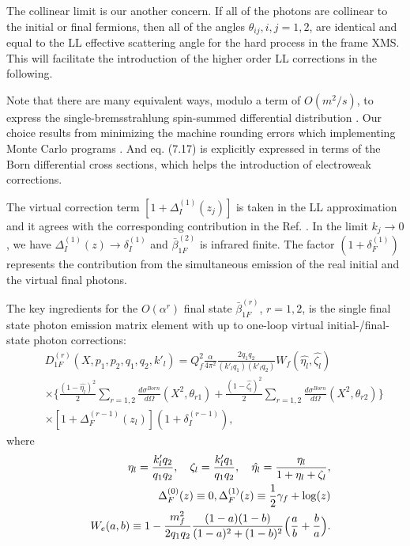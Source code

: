 The collinear limit is our another concern. If all of the photons are collinear to the initial or final fermions, then all of the angles $\theta_{ij}, i,j=1,2$, are identical and equal to the LL effective
scattering angle for the hard process in the frame XMS. This will facilitate the introduction of  the higher order LL corrections in the following.

Note that there are many equivalent ways, modulo a term of $O(m^2/s)$, to express the single-bremsstrahlung spin-summed differential distribution \cite{BKJ-NPB}. Our choice results from minimizing the machine rounding errors which implementing Monte Carlo programs \cite{KORALZ,YFS2,KKMC}. And eq. (7.17) is explicitly expressed in terms of the Born differential cross sections, which helps the introduction of electroweak corrections.

The virtual correction term $[1+\Delta_I^{(1)}(z_j)]$ is taken in the LL approximation and it agrees with the corresponding contribution in the Ref. \cite{BWF-NPB}. In the limit $k_j\to 0$, we have $\Delta_I^{(1)}(z)\to \delta_I^{(1)}$ and $\bar{\beta}_{1F}^{(2)}$ is infrared finite. The factor $(1+\delta_F^{(1)})$ represents the contribution from the simultaneous emission of the real initial and the virtual final photons.

The key ingredients for the $O(\alpha^r)$ final state $\bar{\beta}_{1F}^{(r)}$, $r=1,2$, is the single final state photon emission matrix element with up to one-loop virtual initial-/final-state photon corrections:
\begin{eqnarray}
&&D_{1F}^{(r)}(X,p_1,p_2,q_1,q_2,k'_l)=Q_f^2\frac{\alpha}{4\pi^2}\frac{2q_1 q_2}{(k'_l q_1)(k'_l q_2)} W_f(\hat{\eta_l},\hat{\zeta_l})\nonumber\\
&&\times \Biggl\{ \frac{(1-\hat{\eta_l})^2}{2} \sum_{r=1,2} \frac{d\sigma^{Born}}{d\Omega}(X^2, \theta_{r1}) + \frac{(1-\hat{\zeta_l})^2}{2} \sum_{r=1,2} \frac{d\sigma^{Born}}{d\Omega}(X^2, \theta_{r2}) \Biggr\}\nonumber\\
&&\times \left[1+\Delta_F^{(r-1)}(z_l)\right](1+\delta_I^{(r-1)}),
\end{eqnarray} 
where
\begin{eqnarray}
&&\eta_l=\frac{k'_l q_2}{q_1 q_2}, \quad \zeta_l=\frac{k'_l q_1}{q_1 q_2}, \quad
\hat{\eta_l}=\frac{\eta_l}{1+\eta_l+\zeta_l},\nonumber\\
&&\Delta_F^{(0)}(z)\equiv 0, \Delta_F^{(1)}(z)\equiv \frac{1}{2}\gamma_f+\log(z)\nonumber\\
&&W_e(a,b)\equiv 1-\frac{m_f^2}{2q_1 q_2}\frac{(1-a)(1-b)}{(1-a)^2+(1-b)^2}\Bigl(\frac{a}{b}+\frac{b}{a}\Bigr).
\end{eqnarray}

